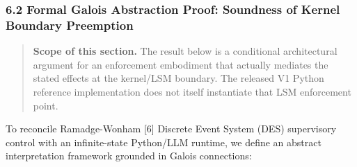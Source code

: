 \documentclass[
  10pt,letterpaper]{article}
\begin{document}
\subsubsection{6.2 Formal Galois Abstraction Proof: Soundness of Kernel
Boundary
Preemption}\label{formal-galois-abstraction-proof-soundness-of-kernel-boundary-preemption}

\begin{quote}
\textbf{Scope of this section.} The result below is a conditional architectural
argument for an enforcement embodiment that actually mediates the stated
effects at the kernel/LSM boundary. The released V1 Python reference
implementation does not itself instantiate that LSM enforcement point.
\end{quote}

To reconcile Ramadge-Wonham {[}6{]} Discrete Event System (DES)
supervisory control with an infinite-state Python/LLM runtime, we define
an abstract interpretation framework grounded in Galois connections:
\end{document}
